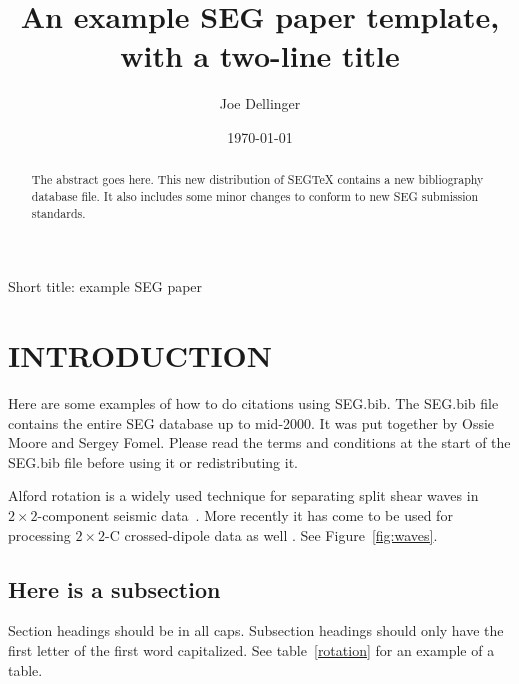 \documentclass{geophysics}
\begin{document}
\title{An example SEG paper template,\\with a two-line title}

\author{Joe Dellinger}
\address{BP Amoco UTG, 200 Westlake Park Blvd, Houston, TX, 77079, USA}


\date{\today}

\maketitle

{Short title: example SEG paper}

\begin{abstract}
The abstract goes here.
This new distribution of SEGTeX contains a new bibliography database file.
It also includes some minor changes to conform to new SEG submission standards.
\end{abstract}

\section{INTRODUCTION}
Here are some examples of how to do citations using SEG.bib.
The SEG.bib file contains the entire SEG database up to mid-2000. It was
put together by Ossie Moore and Sergey Fomel. Please read the terms and
conditions at the start of the SEG.bib file before using it or
redistributing it.

Alford  rotation is a widely used technique for
separating split shear waves in $2{\times}2$-component
seismic data~\cite{GEO53-03-03040313}.
More recently it has come to be used for processing $2{\times}2$-C
crossed-dipole data as well \cite{SEG-1994-0233,SEG-1994-1139,SEG-1994-1143}.
See Figure~\ref{fig:waves}.


\subsection{Here is a subsection}
Section headings should be in all caps. Subsection headings should only
have the first letter of the first word capitalized.
See table~\ref{rotation} for an example of a table.
\end{document}
